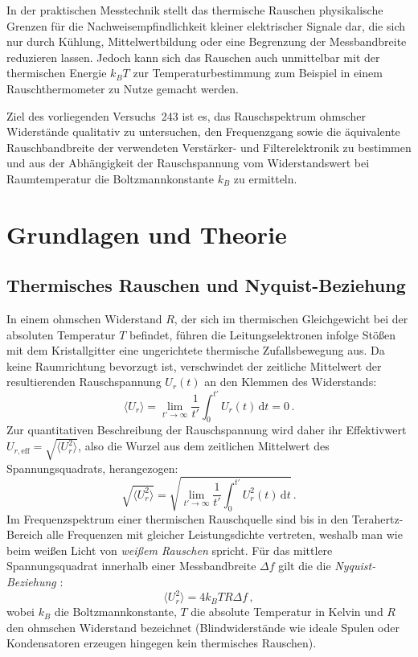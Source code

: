 \documentclass[12pt,a4paper,titlepage]{scrartcl}
\numberwithin{equation}{section}
\numberwithin{table}{section}
\numberwithin{figure}{section}
\begin{document}
In der praktischen Messtechnik stellt das thermische Rauschen physikalische Grenzen für die Nachweisempfindlichkeit kleiner elektrischer Signale dar, die sich nur durch Kühlung, Mittelwertbildung oder eine Begrenzung der Messbandbreite reduzieren lassen. Jedoch kann sich das Rauschen auch unmittelbar mit der thermischen Energie $k_B T$ zur Temperaturbestimmung zum Beispiel in einem Rauschthermometer zu Nutze gemacht werden.

\medskip
Ziel des vorliegenden Versuchs~243 ist es, das Rauschspektrum ohmscher Widerstände qualitativ zu untersuchen, den Frequenzgang sowie die äquivalente Rauschbandbreite der verwendeten Verstärker- und Filterelektronik zu bestimmen und aus der Abhängigkeit der Rauschspannung vom Widerstandswert bei Raumtemperatur die Boltzmannkonstante $k_B$ zu ermitteln.

\section{Grundlagen und Theorie}\label{sec:Grundlagen}

\subsection{Thermisches Rauschen und Nyquist-Beziehung}
In einem ohmschen Widerstand $R$, der sich im thermischen Gleichgewicht bei der absoluten Temperatur $T$ befindet, führen die Leitungselektronen infolge Stößen mit dem Kristallgitter eine ungerichtete thermische Zufallsbewegung aus. Da keine Raumrichtung bevorzugt ist, verschwindet der zeitliche Mittelwert der resultierenden Rauschspannung $U_r(t)$ an den Klemmen des Widerstands:
\begin{equation}
    \langle U_r \rangle = \lim_{t' \to \infty} \frac{1}{t'} \int_{0}^{t'} U_r(t)\,\mathrm{d}t = 0 \,.
    \label{eq:mittelwert}
\end{equation}
Zur quantitativen Beschreibung der Rauschspannung wird daher ihr Effektivwert $U_{r,\text{eff}} = \sqrt{\langle U_r^2 \rangle}$, also die Wurzel aus dem zeitlichen Mittelwert des Spannungsquadrats, herangezogen:
\begin{equation}
    \sqrt{\langle U_r^2 \rangle} = \sqrt{\lim_{t' \to \infty} \frac{1}{t'} \int_{0}^{t'} U_r^2(t)\,\mathrm{d}t} \,.
    \label{eq:effektivwert}
\end{equation}
Im Frequenzspektrum einer thermischen Rauschquelle sind bis in den Terahertz-Bereich alle Frequenzen mit gleicher Leistungsdichte vertreten, weshalb man wie beim weißen Licht von \emph{weißem Rauschen} spricht. Für das mittlere Spannungsquadrat innerhalb einer Messbandbreite $\Delta f$ gilt die die \emph{Nyquist-Beziehung} \cite{PAPskript}:
\begin{equation}
    \langle U_r^2 \rangle = 4 k_B T R \Delta f \,,
    \label{eq:nyquist}
\end{equation}
wobei $k_B$ die Boltzmannkonstante, $T$ die absolute Temperatur in Kelvin und $R$ den ohmschen Widerstand bezeichnet (Blindwiderstände wie ideale Spulen oder Kondensatoren erzeugen hingegen kein thermisches Rauschen).
\end{document}
